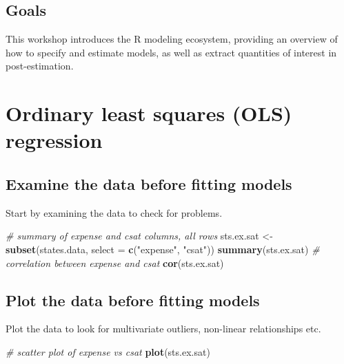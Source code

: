 \documentclass[]{book}
\newenvironment{Shaded}{\begin{snugshade}}{\end{snugshade}}
\newcommand{\KeywordTok}[1]{\textcolor[rgb]{0.13,0.29,0.53}{\textbf{#1}}}
\newcommand{\DataTypeTok}[1]{\textcolor[rgb]{0.13,0.29,0.53}{#1}}
\newcommand{\StringTok}[1]{\textcolor[rgb]{0.31,0.60,0.02}{#1}}
\newcommand{\CommentTok}[1]{\textcolor[rgb]{0.56,0.35,0.01}{\textit{#1}}}
\newcommand{\NormalTok}[1]{#1}
\begin{document}
\subsection{Goals}\label{goals-1}

This workshop introduces the R modeling ecosystem, providing an overview
of how to specify and estimate models, as well as extract quantities of
interest in post-estimation.

\section{Ordinary least squares (OLS)
regression}\label{ordinary-least-squares-ols-regression}

\subsection{Examine the data before fitting
models}\label{examine-the-data-before-fitting-models}

Start by examining the data to check for problems.

\begin{Shaded}
\begin{Highlighting}[]
  \CommentTok{# summary of expense and csat columns, all rows}
\NormalTok{  sts.ex.sat <-}\StringTok{ }\KeywordTok{subset}\NormalTok{(states.data, }\DataTypeTok{select =} \KeywordTok{c}\NormalTok{(}\StringTok{"expense"}\NormalTok{, }\StringTok{"csat"}\NormalTok{))}
  \KeywordTok{summary}\NormalTok{(sts.ex.sat)}
  \CommentTok{# correlation between expense and csat}
  \KeywordTok{cor}\NormalTok{(sts.ex.sat) }
\end{Highlighting}
\end{Shaded}

\subsection{Plot the data before fitting
models}\label{plot-the-data-before-fitting-models}

Plot the data to look for multivariate outliers, non-linear
relationships etc.

\begin{Shaded}
\begin{Highlighting}[]
  \CommentTok{# scatter plot of expense vs csat}
  \KeywordTok{plot}\NormalTok{(sts.ex.sat)}
\end{Highlighting}
\end{Shaded}
\end{document}
